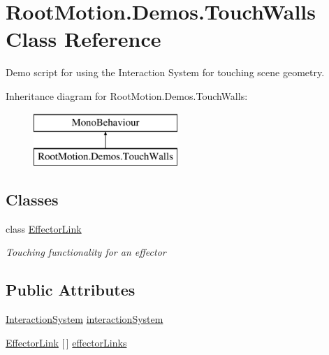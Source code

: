\hypertarget{class_root_motion_1_1_demos_1_1_touch_walls}{}\section{Root\+Motion.\+Demos.\+Touch\+Walls Class Reference}
\label{class_root_motion_1_1_demos_1_1_touch_walls}


Demo script for using the Interaction System for touching scene geometry.  


Inheritance diagram for Root\+Motion.\+Demos.\+Touch\+Walls\+:\begin{figure}[H]
\begin{center}
\leavevmode
\includegraphics[height=2.000000cm]{class_root_motion_1_1_demos_1_1_touch_walls}
\end{center}
\end{figure}
\subsection*{Classes}
\begin{DoxyCompactItemize}
\item 
class \mbox{\hyperlink{class_root_motion_1_1_demos_1_1_touch_walls_1_1_effector_link}{Effector\+Link}}
\begin{DoxyCompactList}\small\item\em Touching functionality for an effector \end{DoxyCompactList}\end{DoxyCompactItemize}
\subsection*{Public Attributes}
\begin{DoxyCompactItemize}
\item 
\mbox{\hyperlink{class_root_motion_1_1_final_i_k_1_1_interaction_system}{Interaction\+System}} \mbox{\hyperlink{class_root_motion_1_1_demos_1_1_touch_walls_aaf86751db277b9b271d627f6a1229281}{interaction\+System}}
\item 
\mbox{\hyperlink{class_root_motion_1_1_demos_1_1_touch_walls_1_1_effector_link}{Effector\+Link}} \mbox{[}$\,$\mbox{]} \mbox{\hyperlink{class_root_motion_1_1_demos_1_1_touch_walls_ae414bb619fd658b550e565c17e59e68f}{effector\+Links}}
\end{DoxyCompactItemize}


